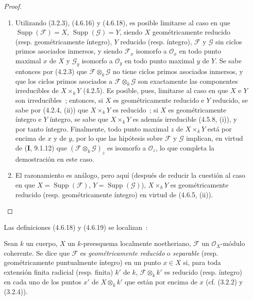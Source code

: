 \begin{proof}
\begin{enumerate}
\item[(i)] Utilizando (3.2.3), (4.6.16) y (4.6.18), es posible limitarse al caso
en que $\operatorname{Supp}(\mathscr F)=X$,
$\operatorname{Supp}(\mathscr G)=Y$, siendo $X$ geométricamente reducido
(resp. geométricamente íntegro), $Y$ reducido (resp. íntegro), $\mathscr F$ y
$\mathscr G$ sin ciclos primos asociados inmersos, y siendo $\mathscr F_x$
isomorfo a $\mathcal O_x$ en todo punto maximal $x$ de $X$ y $\mathscr G_y$
isomorfo a $\mathcal O_y$ en todo punto maximal $y$ de $Y$. Se sabe entonces
por (4.2.3) que $\mathscr F\otimes_k\mathscr G$ no tiene ciclos primos
asociados inmersos, y que los ciclos primos asociados a
$\mathscr F\otimes_k\mathscr G$ son exactamente las componentes irreducibles
de $X\times_k Y$ (4.2.5). Es posible, pues, limitarse al caso en que $X$ e $Y$
son irreducibles~; entonces, si $X$ es geométricamente reducido e $Y$ reducido,
se sabe por (4.2.4, (ii)) que $X\times_k Y$ es reducido~; si $X$ es
geométricamente íntegro e $Y$ íntegro, se sabe que $X\times_k Y$ es además
irreducible (4.5.8, (i)), y por tanto íntegro. Finalmente, todo punto maximal
$z$ de $X\times_k Y$ está por encima de $x$ y de $y$, por lo que las hipótesis
sobre $\mathscr F$ y $\mathscr G$ implican, en virtud de (\textbf I, 9.1.12) que
$(\mathscr F\otimes_k\mathscr G)_z$ es isomorfo a $\mathcal O_z$, lo que
completa la demostración en este caso.

\item[(ii)] El razonamiento es análogo, pero aquí (después de reducir la cuestión al
caso en que $X=\operatorname{Supp}(\mathscr F)$,
$Y=\operatorname{Supp}(\mathscr G)$), $X\times_k Y$ es geométricamente reducido
(resp. geométricamente íntegro) en virtud de (4.6.5, (ii)).
\end{enumerate}
\end{proof}

Las definiciones (4.6.18) y (4.6.19) se localizan~:

\begin{definition}[4.6.22]
\label{IV.2.4.6.22-fr}
Sean $k$ un cuerpo, $X$ un $k$-preesquema localmente noetheriano, $\mathscr F$
un $\mathcal O_X$-módulo coherente. Se dice que $\mathscr F$ es
\emph{geométricamente reducido} o \emph{separable} \textup{(resp. geométricamente
puntualmente íntegro)} en un punto $x\in X$ si, para toda extensión finita
radicial \textup{(resp.} finita) $k'$ de $k$, $\mathscr F\otimes_k k'$ es reducido
\textup{(resp.} íntegro) en cada uno de los puntos $x'$ de $X\otimes_k k'$ que están
por encima de $x$ \textup{(cf. (3.2.2) y (3.2.4))}.
\end{definition}

